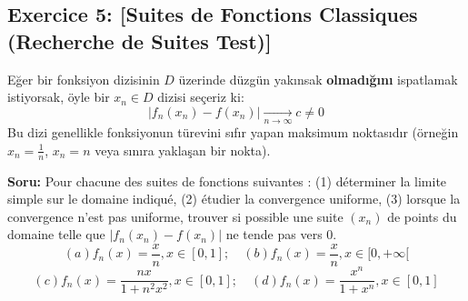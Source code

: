 \documentclass[12pt,a4paper]{report}
\begin{document}
\subsection*{Exercice 5: [Suites de Fonctions Classiques (Recherche de Suites Test)]}

\begin{tcolorbox}[colback=purple!5!white,colframe=purple!75!black,title=Sınav Taktiği: Düzgün Yakınsak Olmadığını Göstermek İçin "Suite Test" Bulma]
Eğer bir fonksiyon dizisinin $D$ üzerinde düzgün yakınsak \textbf{olmadığını} ispatlamak istiyorsak, öyle bir $x_n \in D$ dizisi seçeriz ki:
\[ |f_n(x_n) - f(x_n)| \xrightarrow[n \to \infty]{} c \neq 0 \]
Bu dizi genellikle fonksiyonun türevini sıfır yapan maksimum noktasıdır (örneğin $x_n = \frac{1}{n}$, $x_n = n$ veya sınıra yaklaşan bir nokta).
\end{tcolorbox}

\textbf{Soru:}
Pour chacune des suites de fonctions suivantes : (1) déterminer la limite simple sur le domaine indiqué, (2) étudier la convergence uniforme, (3) lorsque la convergence n'est pas uniforme, trouver si possible une suite $(x_n)$ de points du domaine telle que $|f_n(x_n) - f(x_n)|$ ne tende pas vers 0.
\[ (a) f_n(x) = \frac{x}{n}, x \in [0, 1]; \quad (b) f_n(x) = \frac{x}{n}, x \in [0, +\infty[ \]
\[ (c) f_n(x) = \frac{nx}{1 + n^2 x^2}, x \in [0, 1]; \quad (d) f_n(x) = \frac{x^n}{1 + x^n}, x \in [0, 1] \]
\end{document}
